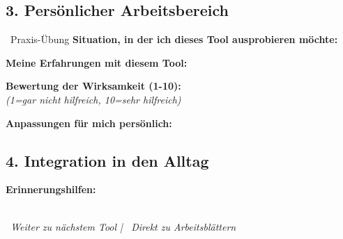\subsection*{\textcolor{ctmmOrange}{3. Persönlicher Arbeitsbereich}}

\begin{ctmmBlueBox}{\faTools~Praxis-Übung}
\textbf{Situation, in der ich dieses Tool ausprobieren möchte:}\\

\vspace{0.5cm}
\textbf{Meine Erfahrungen mit diesem Tool:}\\

\vspace{0.5cm}
\textbf{Bewertung der Wirksamkeit (1-10):}\\
 \quad \textit{(1=gar nicht hilfreich, 10=sehr hilfreich)}

\vspace{0.5cm}
\textbf{Anpassungen für mich persönlich:}\\
\end{ctmmBlueBox}

\subsection*{\textcolor{ctmmOrange}{4. Integration in den Alltag}}

\textbf{Erinnerungshilfen:}\\
 \quad
{} \\
 \quad
{} 

\vspace{1cm}
\begin{center}
\textit{\textcolor{ctmmOrange}{\faChevronRight~Weiter zu nächstem Tool} | \textcolor{ctmmPurple}{\faBookmark~Direkt zu Arbeitsblättern}}
\end{center}
